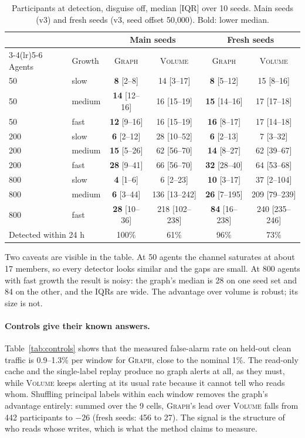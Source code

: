 \documentclass[10pt]{article}
\begin{document}
\begin{table}[t]
\centering\small
\caption{Participants at detection, disguise off, median [IQR] over 10 seeds. Main seeds (v3) and fresh seeds (v3, seed offset 50{,}000). Bold: lower median.}
\label{tab:main}
\begin{tabular}{llcccc}
\toprule
& & \multicolumn{2}{c}{Main seeds} & \multicolumn{2}{c}{Fresh seeds}\\
\cmidrule(lr){3-4}\cmidrule(lr){5-6}
Agents & Growth & \textsc{Graph} & \textsc{Volume} & \textsc{Graph} & \textsc{Volume}\\
\midrule
50  & slow   & \textbf{8} [2--8]   & 14 [3--17]    & \textbf{8} [5--12]   & 15 [8--16]\\
50  & medium & \textbf{14} [12--16] & 16 [15--19]  & \textbf{15} [14--16] & 17 [17--18]\\
50  & fast   & \textbf{12} [9--16] & 16 [15--19]   & \textbf{16} [8--17]  & 17 [14--18]\\
200 & slow   & \textbf{6} [2--12]  & 28 [10--52]   & \textbf{6} [2--13]   & 7 [3--32]\\
200 & medium & \textbf{15} [5--26] & 62 [56--70]   & \textbf{14} [8--27]  & 62 [39--67]\\
200 & fast   & \textbf{28} [9--41] & 66 [56--70]   & \textbf{32} [28--40] & 64 [53--68]\\
800 & slow   & \textbf{4} [1--6]   & 6 [2--23]     & \textbf{10} [3--17]  & 37 [2--104]\\
800 & medium & \textbf{6} [3--44]  & 136 [13--242] & \textbf{26} [7--195] & 209 [79--239]\\
800 & fast   & \textbf{28} [10--36] & 218 [102--238] & \textbf{84} [16--238] & 240 [235--246]\\
\midrule
\multicolumn{2}{l}{Detected within 24 h} & 100\% & 61\% & 96\% & 73\%\\
\bottomrule
\end{tabular}
\end{table}

Two caveats are visible in the table. At 50 agents the channel saturates at about 17 members, so every detector looks similar and the gaps are small. At 800 agents with fast growth the result is noisy: the graph's median is 28 on one seed set and 84 on the other, and the IQRs are wide. The advantage over volume is robust; its size is not.

\paragraph{Controls give their known answers.} Table~\ref{tab:controls} shows that the measured false-alarm rate on held-out clean traffic is 0.9--1.3\% per window for \textsc{Graph}, close to the nominal 1\%. The read-only cache and the single-label replay produce no graph alerts at all, as they must, while \textsc{Volume} keeps alerting at its usual rate because it cannot tell who reads whom. Shuffling principal labels within each window removes the graph's advantage entirely: summed over the 9 cells, \textsc{Graph}'s lead over \textsc{Volume} falls from 442 participants to $-26$ (fresh seeds: 456 to 27). The signal is the structure of who reads whose writes, which is what the method claims to measure.
\end{document}
